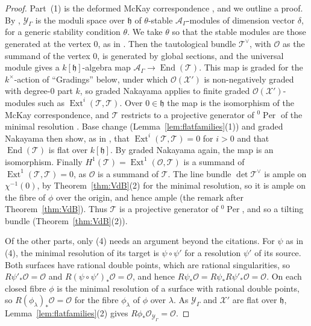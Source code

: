 \documentclass[11pt]{amsart}
\numberwithin{table}{section}
\numberwithin{figure}{section}
\numberwithin{equation}{section}
\theoremstyle{definition}
\theoremstyle{plain}
\newcommand{\cA}{\mathcal{A}}
\newcommand{\cO}{\mathcal{O}}
\newcommand{\cX}{\mathcal{X}}
\newcommand{\cY}{\mathcal{Y}}
\newcommand{\h}{\mathfrak{h}}
\DeclareMathOperator{\End}{End}
\DeclareMathOperator{\Ext}{Ext}
\DeclareMathOperator{\Per}{Per}
\begin{document}
\begin{proof}
Part~(1) is the deformed McKay correspondence \cite[Prop~4.15]{K}, and we outline a proof. By \cite[\S\S5, 7]{CS}, $\cY_\Gamma$ is the moduli space over $\h$ of $\theta$-stable $\cA_\Gamma$-modules of dimension vector $\delta$, for a generic stability condition $\theta$. We take $\theta$ so that the stable modules are those generated at the vertex $0$, as in \cite[\S3.2]{K}. Then the tautological bundle $\mathcal T^\vee$, with $\cO$ as the summand of the vertex $0$, is generated by global sections, and the universal module gives a $k[\h]$-algebra map $\cA_\Gamma \to \End(\mathcal T)$. This map is graded for the $k^\times$-action of ``Gradings'' below, under which $\cO(\cX')$ is non-negatively graded with degree-$0$ part $k$, so graded Nakayama applies to finite graded $\cO(\cX')$-modules such as $\Ext^i(\mathcal T, \mathcal T)$. Over $0 \in \h$ the map is the isomorphism of the McKay correspondence, and $\mathcal T$ restricts to a projective generator of ${}^0\Per$ of the minimal resolution \cite[Prop~3.7, \S4.1]{K}. Base change (Lemma~\ref{lem:flatfamilies}(1)) and graded Nakayama then show, as in \cite[Lemma~5.3]{Kar18}, that $\Ext^i(\mathcal T, \mathcal T) = 0$ for $i > 0$ and that $\End(\mathcal T)$ is flat over $k[\h]$. By graded Nakayama again, the map is an isomorphism. Finally $H^1(\mathcal T) = \Ext^1(\cO, \mathcal T)$ is a summand of $\Ext^1(\mathcal T, \mathcal T) = 0$, as $\cO$ is a summand of $\mathcal T$. The line bundle $\det \mathcal T^\vee$ is ample on $\chi^{-1}(0)$, by Theorem~\ref{thm:VdB}(2) for the minimal resolution, so it is ample on the fibre of $\phi$ over the origin, and hence ample (the remark after Theorem~\ref{thm:VdB}). Thus $\mathcal T$ is a projective generator of ${}^0\Per$, and so a tilting bundle (Theorem~\ref{thm:VdB}(2)).

Of the other parts, only (4) needs an argument beyond the citations. For $\psi$ as in (4), the minimal resolution of its target is $\psi \circ \psi'$ for a resolution $\psi'$ of its source. Both surfaces have rational double points, which are rational singularities, so $R\psi'_*\cO = \cO$ and $R(\psi \circ \psi')_*\cO = \cO$, and hence $R\psi_*\cO = R\psi_*R\psi'_*\cO = \cO$. On each closed fibre $\phi$ is the minimal resolution of a surface with rational double points, so $R(\phi_\lambda)_*\cO = \cO$ for the fibre $\phi_\lambda$ of $\phi$ over $\lambda$. As $\cY_\Gamma$ and $\cX'$ are flat over $\h$, Lemma~\ref{lem:flatfamilies}(2) gives $R\phi_*\cO_{\cY_\Gamma} = \cO$.
\end{proof}
\end{document}
